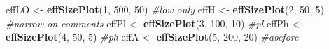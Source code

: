 \documentclass[10pt,]{scrartcl}
\newenvironment{Shaded}{\begin{snugshade}}{\end{snugshade}}
\newcommand{\KeywordTok}[1]{\textcolor[rgb]{0.13,0.29,0.53}{\textbf{#1}}}
\newcommand{\DecValTok}[1]{\textcolor[rgb]{0.00,0.00,0.81}{#1}}
\newcommand{\StringTok}[1]{\textcolor[rgb]{0.31,0.60,0.02}{#1}}
\newcommand{\CommentTok}[1]{\textcolor[rgb]{0.56,0.35,0.01}{\textit{#1}}}
\newcommand{\NormalTok}[1]{#1}
\begin{document}
\begin{Shaded}
\begin{Highlighting}[]
\NormalTok{effLO <-}\StringTok{ }\KeywordTok{effSizePlot}\NormalTok{(}\DecValTok{1}\NormalTok{, }\DecValTok{500}\NormalTok{, }\DecValTok{50}\NormalTok{)  }\CommentTok{#low only}
\NormalTok{effH <-}\StringTok{ }\KeywordTok{effSizePlot}\NormalTok{(}\DecValTok{2}\NormalTok{, }\DecValTok{50}\NormalTok{, }\DecValTok{5}\NormalTok{)  }\CommentTok{#narrow on comments}
\NormalTok{effPl <-}\StringTok{ }\KeywordTok{effSizePlot}\NormalTok{(}\DecValTok{3}\NormalTok{, }\DecValTok{100}\NormalTok{, }\DecValTok{10}\NormalTok{)  }\CommentTok{#pl}
\NormalTok{effPh <-}\StringTok{ }\KeywordTok{effSizePlot}\NormalTok{(}\DecValTok{4}\NormalTok{, }\DecValTok{50}\NormalTok{, }\DecValTok{5}\NormalTok{)  }\CommentTok{#ph}
\NormalTok{effA <-}\StringTok{ }\KeywordTok{effSizePlot}\NormalTok{(}\DecValTok{5}\NormalTok{, }\DecValTok{200}\NormalTok{, }\DecValTok{20}\NormalTok{)  }\CommentTok{#abefore}
\end{Highlighting}
\end{Shaded}

\normalsize
\end{document}

